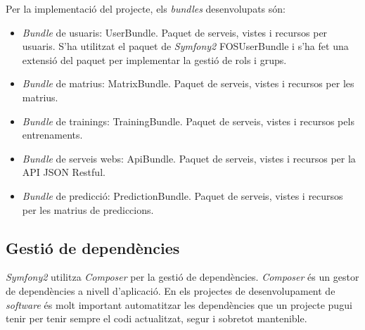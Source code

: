 Per la implementació del projecte, els \textit{bundles} desenvolupats s\'{o}n:
\begin{itemize}
\item \textit{Bundle} de usuaris: UserBundle. Paquet de serveis, vistes i recursos per usuaris. S'ha utilitzat el paquet de \textit{Symfony2} FOSUserBundle \cite{fosuserbundle} i s'ha fet una extensi\'{o} del paquet per implementar la gesti\'{o} de rols i grups. 
\item \textit{Bundle} de matrius: MatrixBundle. Paquet de serveis, vistes i recursos per les matrius.
\item \textit{Bundle} de trainings: TrainingBundle. Paquet de serveis, vistes i recursos pels entrenaments.
\item \textit{Bundle} de serveis webs: ApiBundle. Paquet de serveis, vistes i recursos per la API JSON Restful. 
\item \textit{Bundle} de predicci\'{o}: PredictionBundle. Paquet de serveis, vistes i recursos per les matrius de prediccions.
\end{itemize}

\subsection{Gesti\'{o} de depend\`{e}ncies} 
\label{subsec:dependencies}
\textit{Symfony2} utilitza \textit{Composer} per la gesti\'{o} de depend\`{e}ncies.\cite{composer} \textit{Composer} \'{e}s un gestor de dependències a nivell d'aplicaci\'{o}. En els projectes de desenvolupament de \textit{software} \'{e}s molt important automatitzar les dependències que un projecte pugui tenir per tenir sempre el codi actualitzat, segur i sobretot mantenible.\\

